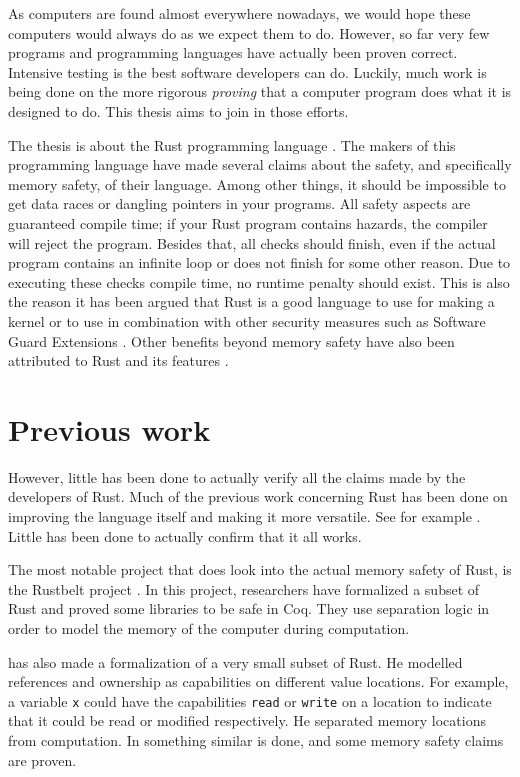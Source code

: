 As computers are found almost everywhere nowadays, we would hope these computers would always do as we expect them to do. However, so far very few programs and programming languages have actually been proven correct. Intensive testing is the best software developers can do. Luckily, much work is being done on the more rigorous \emph{proving} that a computer program does what it is designed to do. This thesis aims to join in those efforts. 

The thesis is about the Rust programming language \citep{matsakis2014rust}. The makers of this programming language have made several claims about the safety, and specifically memory safety, of their language. Among other things, it should be impossible to get data races or dangling pointers in your programs. All safety aspects are guaranteed compile time; if your Rust program contains hazards, the compiler will reject the program. Besides that, all checks should finish, even if the actual program contains an infinite loop or does not finish for some other reason. Due to executing these checks compile time, no runtime penalty should exist. This is also the reason it has been argued that Rust is a good language to use for making a kernel \citep{levy2017kernel} or to use in combination with other security measures such as Software Guard Extensions \citep{ding2017sgx}. Other benefits beyond memory safety have also been attributed to Rust and its features \citep{balasubramanian2017system}.

\section{Previous work}
However, little has been done to actually verify all the claims made by the developers of Rust. Much of the previous work concerning Rust has been done on improving the language itself and making it more versatile. See for example \cite{jespersen2015session}. Little has been done to actually confirm that it all works. 

The most notable project that does look into the actual memory safety of Rust, is the Rustbelt project \citep{jung2017rustbelt}. In this project, researchers have formalized a subset of Rust and proved some libraries to be safe in Coq. They use separation logic in order to model the memory of the computer during computation. 

\cite{benitez2016rusty} has also made a formalization of a very small subset of Rust. He modelled references and ownership as capabilities on different value locations. For example, a variable \verb|x| could have the capabilities \texttt{read} or \texttt{write} on a location to indicate that it could be read or modified respectively. He separated memory locations from computation. In \cite{reed2015patina} something similar is done, and some memory safety claims are proven. 

